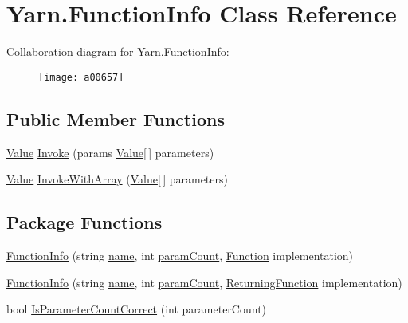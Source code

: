 \hypertarget{a00108}{\section{Yarn.\-Function\-Info Class Reference}
\label{a00108}
}


Collaboration diagram for Yarn.\-Function\-Info\-:
\nopagebreak
\begin{figure}[H]
\begin{center}
\leavevmode
\texttt{[image: a00657]}
\end{center}
\end{figure}
\subsection*{Public Member Functions}
\begin{DoxyCompactItemize}
\item 
\hyperlink{a00189}{Value} \hyperlink{a00108_ab400ac66785d7df2e3fc0f3ce3796044}{Invoke} (params \hyperlink{a00189}{Value}\mbox{[}$\,$\mbox{]} parameters)
\item 
\hyperlink{a00189}{Value} \hyperlink{a00108_a3ce11058d35232907a738de4bb094c67}{Invoke\-With\-Array} (\hyperlink{a00189}{Value}\mbox{[}$\,$\mbox{]} parameters)
\end{DoxyCompactItemize}
\subsection*{Package Functions}
\begin{DoxyCompactItemize}
\item 
\hyperlink{a00108_a93457cd0e838cb2ef59cc2a3a46ce758}{Function\-Info} (string \hyperlink{a00108_adb38e83e3c1597b553aeff14bef5bfcb}{name}, int \hyperlink{a00108_aa8527de9e4f153b05164ccaf167c3186}{param\-Count}, \hyperlink{a00053_ae0be2e5cf13d5779816102439e61ff1a}{Function} implementation)
\item 
\hyperlink{a00108_a41d97c09da25caede70cb734d18113b9}{Function\-Info} (string \hyperlink{a00108_adb38e83e3c1597b553aeff14bef5bfcb}{name}, int \hyperlink{a00108_aa8527de9e4f153b05164ccaf167c3186}{param\-Count}, \hyperlink{a00053_a5177bf74fbfe7303fac9d8236c2e514b}{Returning\-Function} implementation)
\item 
bool \hyperlink{a00108_a1ed09ff8aafa230a0d2bbc23cd6cd763}{Is\-Parameter\-Count\-Correct} (int parameter\-Count)
\end{DoxyCompactItemize}
